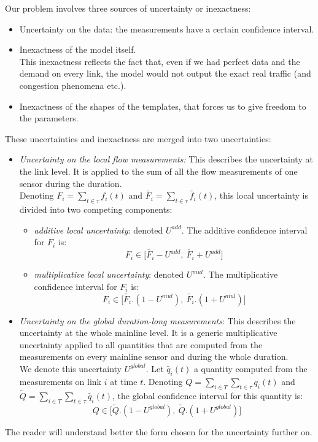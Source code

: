 Our problem involves three sources of uncertainty or inexactness:
\begin{itemize}
	\item Uncertainty on the data: the measurements have a certain confidence interval.
	\item Inexactness of the model itself.\\
	This inexactness reflects the fact that, even if we had perfect data and the demand on every link, the model would not output the exact real traffic (and congestion phenomena etc.).
	\item Inexactness of the shapes of the templates, that forces us to give freedom to the parameters.
\end{itemize}
These uncertainties and inexactness are merged into two uncertainties:
\begin{itemize}
	\item \emph{Uncertainty on the local flow measurements:} This describes the uncertainty at the link level. It is applied to the sum of all the flow measurements of one sensor during the duration.\\
	Denoting $F_{i}=\sum\limits_{t\in\tau}f_{i}(t)$ and $\widetilde{F_{i}}=\sum\limits_{t\in\tau}\widetilde{f_{i}}(t)$, this local uncertainty is divided into two competing components:
	\begin{itemize}
		\item \emph{additive local uncertainty}: denoted $U^{add}$. The additive confidence interval for $F_{i}$ is:
		\begin{equation*}
			F_{i}\in\big[\widetilde{F_{i}}-U^{add},\ \widetilde{F_{i}}+U^{add}\big]
		\end{equation*}		
		\item \emph{multiplicative local uncertainty}: denoted $U^{mul}$. The multiplicative confidence interval for $F_{i}$ is:
		\begin{equation*}
		 	F_{i}\in\big[\widetilde{F_{i}}.(1-U^{mul}),\ \widetilde{F_{i}}.(1+U^{mul})\big]
		\end{equation*}
	\end{itemize}
	\item \emph{Uncertainty on the global duration-long measurements}: This describes the uncertainty at the whole mainline level. It is a generic multiplicative uncertainty applied to all quantities that are computed from the measurements on every mainline sensor and during the whole duration.\\
	We denote this uncertainty $U^{global}$. Let $\widetilde{q_{i}}(t)$ a quantity computed from the measurements on link $i$ at time $t$. Denoting $Q=\sum\limits_{i\in T}\sum\limits_{t\in\tau}q_{i}(t)$ and $\widetilde{Q}=\sum\limits_{i\in T}\sum\limits_{t\in\tau}\widetilde{q_{i}}(t)$, the global confidence interval for this quantity is:\\
	\begin{equation*}
		 Q\in \big[\widetilde{Q}.(1-U^{global}),\ \widetilde{Q}.(1+U^{global})\big]
	\end{equation*}	
\end{itemize}
The reader will understand better the form chosen for the uncertainty further on.